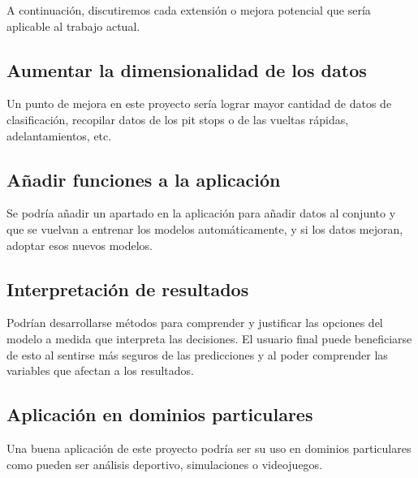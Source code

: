 A continuación, discutiremos cada extensión o mejora potencial que sería aplicable al trabajo actual.

\subsection{Aumentar la dimensionalidad de los datos}
Un punto de mejora en este proyecto sería lograr mayor cantidad de datos de clasificación, recopilar datos de los pit stops o de las vueltas rápidas, adelantamientos, etc.

\subsection{Añadir funciones a la aplicación}
Se podría añadir un apartado en la aplicación para añadir datos al conjunto y que se vuelvan a entrenar los modelos automáticamente, y si los datos mejoran, adoptar esos nuevos modelos.

\subsection{Interpretación de resultados}
Podrían desarrollarse métodos para comprender y justificar las opciones del modelo a medida que interpreta las decisiones. El usuario final puede beneficiarse de esto al sentirse más seguros de las predicciones y al poder comprender las variables que afectan a los resultados.

\subsection{Aplicación en dominios particulares}
Una buena aplicación de este proyecto podría ser su uso en dominios particulares como pueden ser análisis deportivo, simulaciones o videojuegos.
